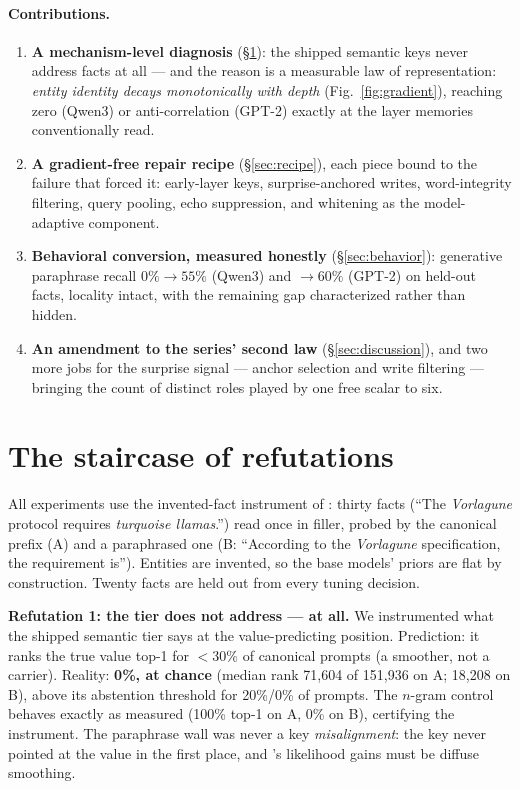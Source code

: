 \documentclass[11pt]{article}
\begin{document}
\paragraph{Contributions.}
\begin{enumerate}[leftmargin=1.5em,itemsep=2pt]
\item \textbf{A mechanism-level diagnosis} (\S\ref{sec:staircase}): the shipped semantic keys never address facts at all --- and the reason is a measurable law of representation: \emph{entity identity decays monotonically with depth} (Fig.~\ref{fig:gradient}), reaching zero (Qwen3) or anti-correlation (GPT-2) exactly at the layer memories conventionally read.
\item \textbf{A gradient-free repair recipe} (\S\ref{sec:recipe}), each piece bound to the failure that forced it: early-layer keys, surprise-anchored writes, word-integrity filtering, query pooling, echo suppression, and whitening as the model-adaptive component.
\item \textbf{Behavioral conversion, measured honestly} (\S\ref{sec:behavior}): generative paraphrase recall $0\% \to 55\%$ (Qwen3) and $\to 60\%$ (GPT-2) on held-out facts, locality intact, with the remaining gap characterized rather than hidden.
\item \textbf{An amendment to the series' second law} (\S\ref{sec:discussion}), and two more jobs for the surprise signal --- anchor selection and write filtering --- bringing the count of distinct roles played by one free scalar to six.
\end{enumerate}

\section{The staircase of refutations}\label{sec:staircase}

All experiments use the invented-fact instrument of \cite{behavior}: thirty facts (``The \emph{Vorlagune} protocol requires \emph{turquoise llamas}.'') read once in filler, probed by the canonical prefix (A) and a paraphrased one (B: ``According to the \emph{Vorlagune} specification, the requirement is''). Entities are invented, so the base models' priors are flat by construction. Twenty facts are held out from every tuning decision.

\textbf{Refutation 1: the tier does not address --- at all.} We instrumented what the shipped semantic tier says at the value-predicting position. Prediction: it ranks the true value top-1 for $<30\%$ of canonical prompts (a smoother, not a carrier). Reality: \textbf{0\%, at chance} (median rank 71{,}604 of 151{,}936 on A; 18{,}208 on B), above its abstention threshold for 20\%/0\% of prompts. The $n$-gram control behaves exactly as \cite{behavior} measured (100\% top-1 on A, 0\% on B), certifying the instrument. The paraphrase wall was never a key \emph{misalignment}: the key never pointed at the value in the first place, and \cite{router}'s likelihood gains must be diffuse smoothing.
\end{document}
